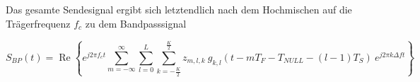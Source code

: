 Das gesamte Sendesignal ergibt sich letztendlich nach dem Hochmischen auf die Trägerfrequenz $f_c$ zu dem Bandpasssignal

\begin{equation}
S_{BP}(t) = \operatorname{Re} \left\{e^{j2 \pi f_c t} \sum \limits_{m=-\infty}^{\infty} \sum \limits_{l=0}^{L}   \sum \limits_{k=- \frac{K}{2}}^{\frac{K}{2}} z_{m,l,k} \: g_{k,l}(t-mT_F-T_{NULL}-(l-1)T_S) \: e^{j2\pi k \Delta f t}\right\}
\end{equation}
